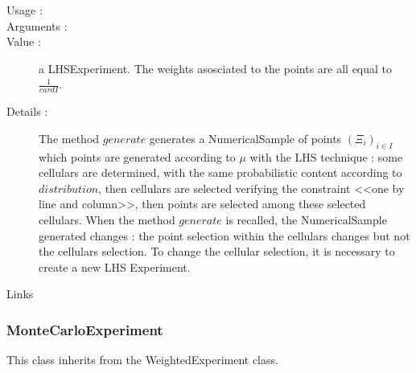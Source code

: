 \begin{description}

\item[Usage :] \rule{0pt}{1em}

\item[Arguments :]  \rule{0pt}{1em}

\item[Value :] a LHSExperiment. The weights asosciated to the points are all equal to $\displaystyle \frac{1}{cardI}$.

\item[Details :]  The method $generate$ generates a NumericalSample of points  $(\Xi_i)_{i \in I}$ which points are  generated according to $\mu$  with the LHS technique : some cellulars are determined, with the same probabilistic content according to $distribution$, then cellulars are selected verifying the constraint <<one by line and column>>, then points are selected among these selected cellulars. When the method $generate$ is recalled, the NumericalSample generated changes  : the point selection within the cellulars changes but not the cellulars selection. To change the cellular selection, it is necessary to create a new LHS Experiment.

\item[Links] \rule{0pt}{1em}
\end{description}


\newpage         \subsubsection{MonteCarloExperiment}


This class inherits from the WeightedExperiment class.\\

